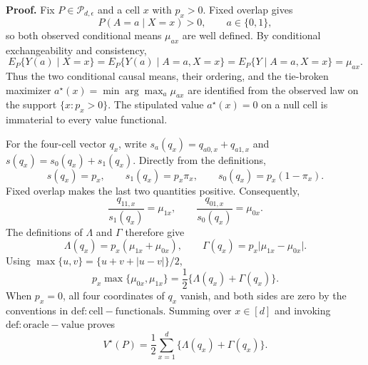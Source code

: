 \textbf{Proof.}
Fix \(P\in\mathcal P_{d,\epsilon}\) and a cell \(x\) with \(p_x>0\).  Fixed overlap gives
\[
 P(A=a\mid X=x)>0,
 \qquad a\in\{0,1\},
\]
so both observed conditional means \(\mu_{ax}\) are well defined.  By conditional exchangeability and consistency,
\[
 E_P\{Y(a)\mid X=x\}
 =E_P\{Y(a)\mid A=a,X=x\}
 =E_P\{Y\mid A=a,X=x\}
 =\mu_{ax}.
\]
Thus the two conditional causal means, their ordering, and the tie-broken maximizer
\(a^\star(x)=\min\arg\max_a\mu_{ax}\) are identified from the observed law on the support \(\{x:p_x>0\}\).  The stipulated value \(a^\star(x)=0\) on a null cell is immaterial to every value functional.

For the four-cell vector \(q_x\), write \(s_a(q_x)=q_{a0,x}+q_{a1,x}\) and \(s(q_x)=s_0(q_x)+s_1(q_x)\).  Directly from the definitions,
\[
 s(q_x)=p_x,
 \qquad s_1(q_x)=p_x\pi_x,
 \qquad s_0(q_x)=p_x(1-\pi_x).
\]
Fixed overlap makes the last two quantities positive.  Consequently,
\[
 \frac{q_{11,x}}{s_1(q_x)}=\mu_{1x},
 \qquad
 \frac{q_{01,x}}{s_0(q_x)}=\mu_{0x}.
\]
The definitions of \(\Lambda\) and \(\Gamma\) therefore give
\[
 \Lambda(q_x)=p_x(\mu_{1x}+\mu_{0x}),
 \qquad
 \Gamma(q_x)=p_x\lvert\mu_{1x}-\mu_{0x}\rvert.
\]
Using \(\max\{u,v\}=\{u+v+\lvert u-v\rvert\}/2\),
\[
 p_x\max\{\mu_{0x},\mu_{1x}\}
 =\frac12\{\Lambda(q_x)+\Gamma(q_x)\}.
\]
When \(p_x=0\), all four coordinates of \(q_x\) vanish, and both sides are zero by the conventions in \(\mathrm{def:cell-functionals}\).  Summing over \(x\in[d]\) and invoking \(\mathrm{def:oracle-value}\) proves
\[
 V^\star(P)=\frac12\sum_{x=1}^d\{\Lambda(q_x)+\Gamma(q_x)\}.
\]